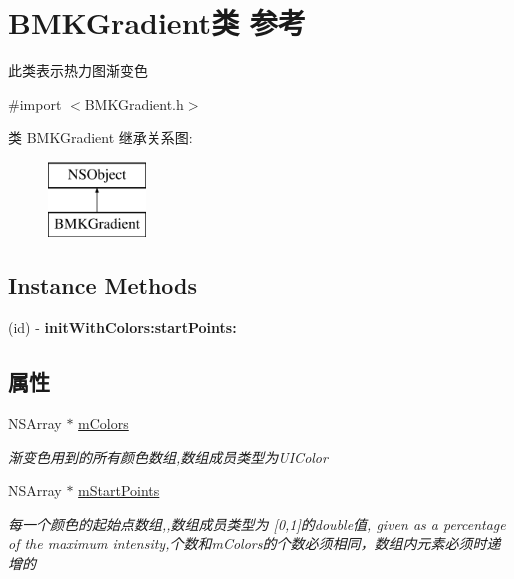 \hypertarget{interface_b_m_k_gradient}{\section{B\+M\+K\+Gradient类 参考}
\label{interface_b_m_k_gradient}
}


此类表示热力图渐变色  




{\ttfamily \#import $<$B\+M\+K\+Gradient.\+h$>$}

类 B\+M\+K\+Gradient 继承关系图\+:\begin{figure}[H]
\begin{center}
\leavevmode
\includegraphics[height=2.000000cm]{interface_b_m_k_gradient}
\end{center}
\end{figure}
\subsection*{Instance Methods}
\begin{DoxyCompactItemize}
\item 
\hypertarget{interface_b_m_k_gradient_af4c887250c744cdfb9f472846449d05b}{(id) -\/ {\bfseries init\+With\+Colors\+:start\+Points\+:}}\label{interface_b_m_k_gradient_af4c887250c744cdfb9f472846449d05b}

\end{DoxyCompactItemize}
\subsection*{属性}
\begin{DoxyCompactItemize}
\item 
\hypertarget{interface_b_m_k_gradient_a74426351e0f774b497b5bc6848c4c97e}{N\+S\+Array $\ast$ \hyperlink{interface_b_m_k_gradient_a74426351e0f774b497b5bc6848c4c97e}{m\+Colors}}\label{interface_b_m_k_gradient_a74426351e0f774b497b5bc6848c4c97e}

\begin{DoxyCompactList}\small\item\em 渐变色用到的所有颜色数组,数组成员类型为\+U\+I\+Color \end{DoxyCompactList}\item 
\hypertarget{interface_b_m_k_gradient_aa26241e329d659f2cadcf2452a7371c6}{N\+S\+Array $\ast$ \hyperlink{interface_b_m_k_gradient_aa26241e329d659f2cadcf2452a7371c6}{m\+Start\+Points}}\label{interface_b_m_k_gradient_aa26241e329d659f2cadcf2452a7371c6}

\begin{DoxyCompactList}\small\item\em 每一个颜色的起始点数组,,数组成员类型为 \mbox{[}0,1\mbox{]}的double值, given as a percentage of the maximum intensity,个数和m\+Colors的个数必须相同，数组内元素必须时递增的 \end{DoxyCompactList}\end{DoxyCompactItemize}


